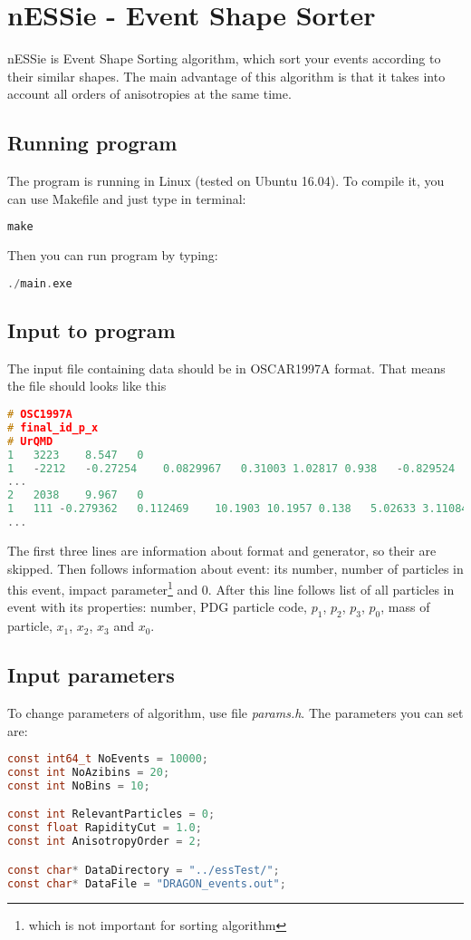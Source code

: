 \documentclass[a4paper]{article}
\begin{document}
\section*{nESSie - Event Shape Sorter}
nESSie is Event Shape Sorting algorithm, which sort your events according to their similar shapes. The main advantage of this algorithm is that it takes into account all orders of anisotropies at the same time.

\subsection*{Running program}
The program is running in Linux (tested on Ubuntu 16.04). To compile it, you can use Makefile and just type in terminal:
\begin{lstlisting}[language=c]
make
\end{lstlisting}

Then you can run program by typing:
\begin{lstlisting}[language=c]
./main.exe
\end{lstlisting}

\subsection*{Input to program}
The input file containing data should be in OSCAR1997A format. That means the file should looks like this
\begin{lstlisting}[language=c]
# OSC1997A
# final_id_p_x
# UrQMD
1 	3223	8.547	0
1	-2212	-0.27254	0.0829967	0.31003	1.02817	0.938	-0.829524	5.68779	10.2909	32.7802
...
2	2038	9.967	0
1	111	-0.279362	0.112469	10.1903	10.1957	0.138	5.02633	3.11084	199.578	200
...
\end{lstlisting}

The first three lines are information about format and generator, so their are skipped. Then follows information about event: its number, number of particles in this event, impact parameter\footnote{which is not important for sorting algorithm} and $0$.
After this line follows list of all particles in event with its properties: number, PDG particle code, $p_1$, $p_2$, $p_3$, $p_0$, mass of particle, $x_1$, $x_2$, $x_3$ and $x_0$.

\subsection*{Input parameters}

To change parameters of algorithm, use file \textit{params.h}. The parameters you can set are:
\begin{lstlisting}[language=c]
const int64_t NoEvents = 10000;
const int NoAzibins = 20;
const int NoBins = 10;

const int RelevantParticles = 0;
const float RapidityCut = 1.0;
const int AnisotropyOrder = 2;

const char* DataDirectory = "../essTest/";
const char* DataFile = "DRAGON_events.out";
\end{lstlisting}
\end{document}
